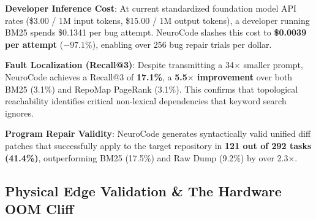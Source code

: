 \documentclass{article}
\begin{document}
\textbf{Developer Inference Cost}: At current standardized foundation model API rates (\$3.00 / 1M input tokens, \$15.00 / 1M output tokens), a developer running BM25 spends \$0.1341 per bug attempt. NeuroCode slashes this cost to \textbf{\$0.0039 per attempt} ($-97.1\%$), enabling over 256 bug repair trials per dollar.

\textbf{Fault Localization (Recall@3)}: Despite transmitting a 34$\times$ smaller prompt, NeuroCode achieves a Recall@3 of \textbf{17.1\%}, a \textbf{5.5$\times$ improvement} over both BM25 (3.1\%) and RepoMap PageRank (3.1\%). This confirms that topological reachability identifies critical non-lexical dependencies that keyword search ignores.

\textbf{Program Repair Validity}: NeuroCode generates syntactically valid unified diff patches that successfully apply to the target repository in \textbf{121 out of 292 tasks (41.4\%)}, outperforming BM25 (17.5\%) and Raw Dump (9.2\%) by over 2.3$\times$.

\subsection{Physical Edge Validation \& The Hardware OOM Cliff}
\end{document}
